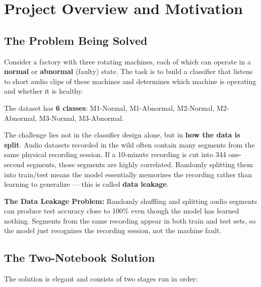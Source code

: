 \documentclass[12pt,a4paper]{article}
\begin{document}
\tableofcontents
\newpage

\section{Project Overview and Motivation}

\subsection{The Problem Being Solved}

Consider a factory with three rotating machines, each of which can operate in a \textbf{normal} or \textbf{abnormal} (faulty) state. The task is to build a classifier that listens to short audio clips of these machines and determines which machine is operating and whether it is healthy.

The dataset has \textbf{6 classes}: M1-Normal, M1-Abnormal, M2-Normal, M2-Abnormal, M3-Normal, M3-Abnormal.

The challenge lies not in the classifier design alone, but in \textbf{how the data is split}. Audio datasets recorded in the wild often contain many segments from the same physical recording session. If a 10-minute recording is cut into 344 one-second segments, those segments are highly correlated. Randomly splitting them into train/test means the model essentially memorizes the recording rather than learning to generalize --- this is called \textbf{data leakage}.

\begin{warningbox}
\textbf{The Data Leakage Problem:} Randomly shuffling and splitting audio segments can produce test accuracy close to 100\% even though the model has learned nothing. Segments from the same recording appear in both train and test sets, so the model just recognizes the recording session, not the machine fault.
\end{warningbox}

\subsection{The Two-Notebook Solution}

The solution is elegant and consists of two stages run in order:
\end{document}
